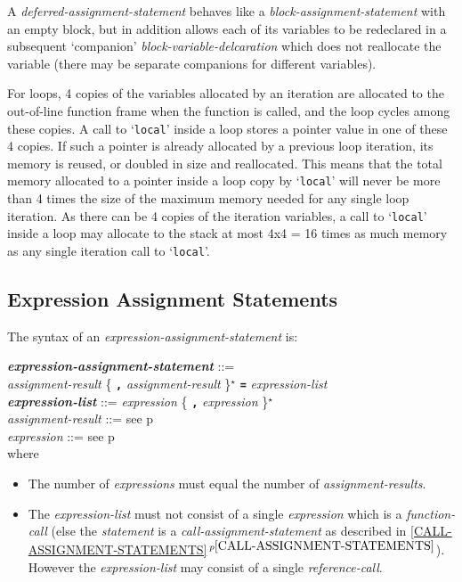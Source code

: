 \documentclass[12pt]{article}
\newcommand{\TT}[1]{{\tt \bfseries #1}}
\newcommand{\STAR}{{\Large $^\star$}}
\newcommand{\emkey}[1]{{\em \bfseries #1}}
\newcommand{\itemref}[1]{\ref{#1}$\,^{p\pageref{#1}}$}
\newcommand{\pagref}[1]{p\pageref{#1}}
\newenvironment{indpar}[1][0.3in]%
	{\begin{list}{}%
		     {\setlength{\itemsep}{0in}%
		      \setlength{\topsep}{0in}%
		      \setlength{\parsep}{1ex}%
		      \setlength{\labelwidth}{#1}%
		      \setlength{\leftmargin}{#1}%
		      \addtolength{\leftmargin}{\labelsep}}%
	 \item}%
	{\end{list}}
\begin{document}
A {\em deferred-assignment-statement}
behaves like a {\em block-assignment-statement} with an empty block,
but in addition allows each of its variables to be redeclared in a subsequent
`companion' {\em block-variable-delcaration} which does not
reallocate the variable (there may be separate companions for different
variables).

For loops\label{LOOP-ALLOCATION},
4 copies of the variables allocated by an iteration
are allocated to the out-of-line function frame when the function is called,
and the loop cycles among these copies.
A call to `{\tt local}' inside a loop stores a pointer value in
one of these 4 copies.  If such a pointer is already
allocated by a previous loop iteration, its memory is reused, or
doubled in size and reallocated.  This means that the total memory allocated
to a pointer inside a loop copy by `{\tt local}' will never be more than
4 times the size of the maximum memory needed for any single loop
iteration.  As there can be 4 copies of the iteration variables,
a call to `{\tt local}' inside a loop
may allocate to the stack at most 4x4 = 16 times as much
memory as any single iteration call to `{\tt local}'.


\subsection{Expression Assignment Statements}
\label{EXPRESSION-ASSIGNMENT-STATEMENTS}

The syntax of an {\em expression-assign\-ment-statement} is:
\begin{indpar}
\emkey{expression-assignment-statement} ::= \\
\hspace*{0.5in} {\em assignment-result}
                \{ \TT{,} {\em assignment-result} \}\STAR{}
		\TT{=} {\em expression-list}
\\[0.5ex]
\emkey{expression-list}\label{EXPRESSION-LIST} ::=
	      {\em expression} \{ \TT{,} {\em expression} \}\STAR{}
\\[0.5ex]
{\em assignment-result} ::= see \pagref{ASSIGNMENT-RESULT}
\\[0.5ex]
{\em expression} ::= see \pagref{EXPRESSION}
\\[2.0ex]
where
\begin{itemize}

\item The number of {\em expressions} must equal the number
of {\em assignment-results}.

\item The {\em expression-list} must not consist of a single
{\em expression} which is a {\em function-call} (else the
{\em statement} is a {\em call-assignment-statement} as described in
\itemref{CALL-ASSIGNMENT-STATEMENTS}).  However the {\em expression-list}
may consist of a single {\em reference-call}.

\end{itemize}
\end{indpar}
\end{document}
